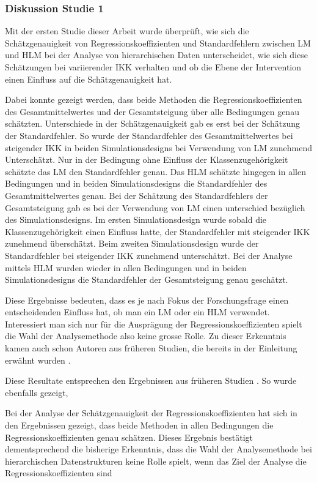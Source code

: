 \documentclass[12pt]{article}\usepackage[]{graphicx}\usepackage[]{color}
\begin{document}
\subsubsection{Diskussion Studie 1}
Mit der ersten Studie dieser Arbeit wurde überprüft, wie sich die Schätzgenauigkeit von Regressionskoeffizienten und Standardfehlern zwischen LM und HLM bei der Analyse von hierarchischen Daten unterscheidet, wie sich diese Schätzungen bei variierender IKK verhalten und ob die Ebene der Intervention einen Einfluss auf die Schätzgenauigkeit hat. 

Dabei konnte gezeigt werden, dass beide Methoden die Regressionskoeffizienten des Gesamtmittelwertes und der Gesamtsteigung über alle Bedingungen genau schätzten. Unterschiede in der Schätzgenauigkeit gab es erst bei der Schätzung der Standardfehler. So wurde der Standardfehler des Gesamtmittelwertes bei steigender IKK in beiden Simulationsdesigns bei Verwendung von LM zunehmend Unterschätzt. Nur in der Bedingung ohne Einfluss der Klassenzugehörigkeit schätzte das LM den Standardfehler genau. Das HLM schätzte hingegen in allen Bedingungen und in beiden Simulationsdesigns die Standardfehler des Gesamtmittelwertes genau. Bei der Schätzung des Standardfehlers der Gesamtsteigung gab es bei der Verwendung von LM einen unterschied bezüglich des Simulationsdesigns. Im ersten Simulationsdesign wurde sobald die Klassenzugehörigkeit einen Einfluss hatte, der Standardfehler mit steigender IKK zunehmend überschätzt. Beim zweiten Simulationsdesign wurde der Standardfehler bei steigender IKK zunehmend unterschätzt. Bei der Analyse mittels HLM wurden wieder in allen Bedingungen und in beiden Simulationsdesigns die Standardfehler der Gesamtsteigung genau geschätzt.

Diese Ergebnisse bedeuten, dass es je nach Fokus der Forschungsfrage einen entscheidenden Einfluss hat, ob man ein LM oder ein HLM verwendet. Interessiert man sich nur für die Ausprägung der Regressionskoeffizienten spielt die Wahl der Analysemethode also keine grosse Rolle. Zu dieser Erkenntnis kamen auch schon Autoren aus früheren Studien, die bereits in der Einleitung erwähnt wurden \citep{mcneish2014analyzing, mundfrom2002monte, osborne2000advantages}.

Diese Resultate entsprechen den Ergebnissen aus früheren Studien \citep{mcneish2014analyzing, MOERBEEK2003341, mundfrom2002monte, osborne2000advantages}. So wurde ebenfalls gezeigt, 

Bei der Analyse der Schätzgenauigkeit der Regressionskoeffizienten hat sich in den Ergebnissen gezeigt, dass beide Methoden in allen Bedingungen die Regressionskoeffizienten genau schätzen. Dieses Ergebnis bestätigt dementsprechend die bisherige Erkenntnis, dass die Wahl der Analysemethode bei hierarchischen Datenstrukturen keine Rolle spielt, wenn das Ziel der Analyse die Regressionskoeffizienten sind 
\end{document}
